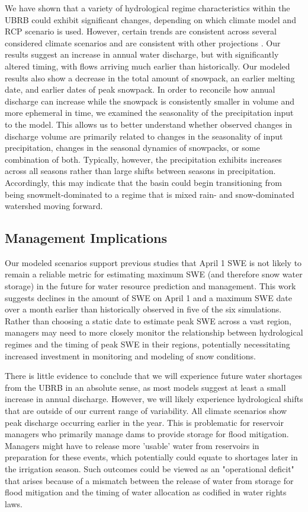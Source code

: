 \documentclass[11pt,letterpaper]{article}
\begin{document}
We have shown that a variety of hydrological regime characteristics within the UBRB could exhibit significant changes, depending on which climate model and RCP scenario is used. However, certain trends are consistent across several considered climate scenarios and are consistent with other projections \citep{Adam:2009ie,Inouye:2014ws,Gergel:2017vj}. Our results suggest an increase in annual water discharge, but with significantly altered timing, with flows arriving much earlier than historically. Our modeled results also show a decrease in the total amount of snowpack, an earlier melting date, and earlier dates of peak snowpack. In order to reconcile how annual discharge can increase while the snowpack is consistently smaller in volume and more ephemeral in time, we examined the seasonality of the precipitation input to the model. This allows us to better understand whether observed changes in discharge volume are primarily related to changes in the seasonality of input precipitation, changes in the seasonal dynamics of snowpacks, or some combination of both. Typically, however, the precipitation exhibits increases across all seasons rather than large shifts between seasons in precipitation. Accordingly, this may indicate that the basin could begin transitioning from being snowmelt-dominated to a regime that is mixed rain- and snow-dominated watershed moving forward.

\subsection{Management Implications}

Our modeled scenarios support previous studies \citep{Pederson:2011ep,Klos:2014jra} that April 1 SWE is not likely to remain a reliable metric for estimating maximum SWE (and therefore snow water storage) in the future for water resource prediction and management. This work suggests declines in the amount of SWE on April 1 and a maximum SWE date over a month earlier than historically observed in five of the six simulations. Rather than choosing a static date to estimate peak SWE across a vast region, managers may need to more closely monitor the relationship between hydrological regimes and the timing of peak SWE in their regions, potentially necessitating increased investment in monitoring and modeling of snow conditions.

There is little evidence to conclude that we will experience future water shortages from the UBRB in an absolute sense, as most models suggest at least a small increase in annual discharge. However, we will likely experience hydrological shifts that are outside of our current range of variability. All climate scenarios show peak discharge occurring earlier in the year. This is problematic for reservoir managers who primarily manage dams to provide storage for flood mitigation. Managers might have to release more 'usable' water from reservoirs in preparation for these events, which potentially could equate to shortages later in the irrigation season. Such outcomes could be viewed as an "operational deficit" that arises because of a mismatch between the release of water from storage for flood mitigation and the timing of water allocation as codified in water rights laws.
\end{document}
